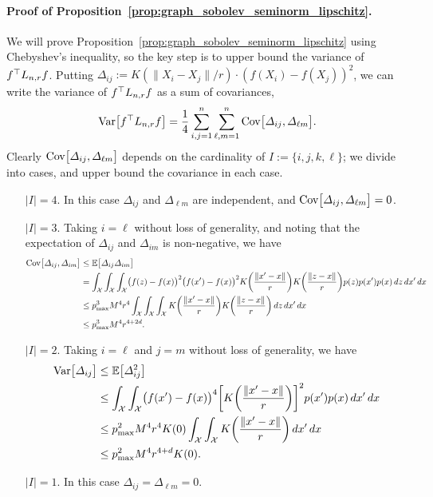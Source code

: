 \paragraph{Proof of Proposition~\ref{prop:graph_sobolev_seminorm_lipschitz}.}
We will prove Proposition~\ref{prop:graph_sobolev_seminorm_lipschitz} using Chebyshev's inequality, so the key step is to upper bound the variance of $f^{\top}L_{n,r}f$. Putting $\varDelta_{ij} := K(\|X_i - X_j\|/r) \cdot (f(X_i) - f(X_j))^2$, we can write the variance of $f^{\top} L_{n,r} f$ as a sum of covariances,
\begin{equation*}
\mathrm{Var}\bigl[f^{\top} L_{n,r} f\bigr] = \frac{1}{4} \sum_{i, j = 1}^{n} \sum_{\ell,m = 1}^{n} \mathrm{Cov}\bigl[\varDelta_{ij},\varDelta_{\ell m}\bigr].
\end{equation*}
Clearly $\mathrm{Cov}\bigl[\varDelta_{ij},\varDelta_{\ell m}\bigr]$ depends on the cardinality of $I := \{i,j,k,\ell\}$; we divide into cases, and upper bound the covariance in each case.
\begin{enumerate}
	\item[$\bigl|I\bigr| = 4$.] In this case $\varDelta_{ij}$ and $\varDelta_{\ell m}$ are independent, and $\mathrm{Cov}\bigl[\varDelta_{ij},\varDelta_{\ell m}\bigr] = 0$.
	\item[$\bigl|I\bigr| = 3$.] Taking $i = \ell$ without loss of generality, and noting that the expectation of $\Delta_{ij}$ and $\Delta_{im}$ is non-negative, we have
	\begin{align*}
	\mathrm{Cov}\bigl[\varDelta_{ij},\varDelta_{i m}\bigr] & \leq \mathbb{E}\bigl[\varDelta_{ij} \varDelta_{i m} \bigr] \\
	& = \int_{\mathcal{X}} \int_{\mathcal{X}} \int_{\mathcal{X}} \bigl(f(z) - f(x)\bigr)^2 \bigl(f(x') - f(x)\bigr)^2 K\biggl(\frac{\|x' - x\|}{r}\biggr) K\biggl(\frac{\|z - x\|}{r}\biggr) p(z) p(x') p(x) \,dz \,dx' \,dx \\
	& \leq p_{\max}^3 M^4 r^4 \int_{\mathcal{X}} \int_{\mathcal{X}} \int_{\mathcal{X}} K\biggl(\frac{\|x' - x\|}{r}\biggr) K\biggl(\frac{\|z - x\|}{r}\biggr) \,dz \,dx' \,dx \\
	& \leq p_{\max}^3 M^4 r^{4 + 2d}.
	\end{align*}
	\item[$\bigl|I\bigr| = 2$.] Taking $i = \ell$ and $j = m$ without loss of generality, we have
	\begin{align*}
	\mathrm{Var}\bigl[\varDelta_{ij}\bigr] & \leq \mathbb{E}\bigl[\varDelta_{ij}^2\bigr] \\
	& \leq \int_{\mathcal{X}} \int_{\mathcal{X}} \bigl(f(x') - f(x)\bigr)^4 \biggl[K\biggl(\frac{\|x' - x\|}{r}\biggr)\biggr]^2 p(x') p(x) \,dx' \,dx \\
	& \leq p_{\max}^2 M^4 r^4 K(0) \int_{\mathcal{X}} \int_{\mathcal{X}} K\biggl(\frac{\|x' - x\|}{r}\biggr) \,dx' \,dx \\
	& \leq p_{\max}^2 M^4 r^{4 + d} K(0).
	\end{align*}
	\item[$\bigl|I\bigr| = 1$.] In this case $\varDelta_{i j} = \varDelta_{\ell m} = 0$.
\end{enumerate}
